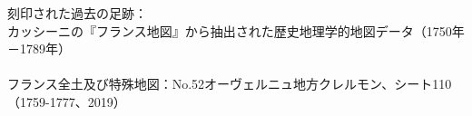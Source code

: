 \documentclass{article}
\begin{document}
\bf
\begin{flushright}
  \begin{CJK}{UTF8}{min}
    刻印された過去の足跡：\\
    \footnotesize
    カッシーニの『フランス地図』から抽出された歴史地理学的地図データ（1750年－1789年）\\
    ~\\
    \scriptsize 
    フランス全土及び特殊地図：No.52オーヴェルニュ地方クレルモン、シート110（1759-1777、2019）
  \end{CJK}
\end{flushright}
\end{document}
